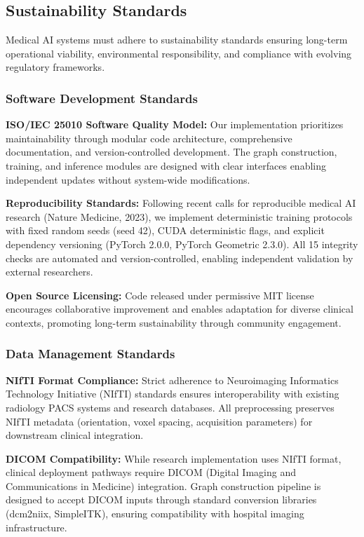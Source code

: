 \subsection{Sustainability Standards}

Medical AI systems must adhere to sustainability standards ensuring long-term operational viability, environmental responsibility, and compliance with evolving regulatory frameworks.

\subsubsection{Software Development Standards}

\textbf{ISO/IEC 25010 Software Quality Model:} Our implementation prioritizes maintainability through modular code architecture, comprehensive documentation, and version-controlled development. The graph construction, training, and inference modules are designed with clear interfaces enabling independent updates without system-wide modifications.

\textbf{Reproducibility Standards:} Following recent calls for reproducible medical AI research (Nature Medicine, 2023), we implement deterministic training protocols with fixed random seeds (seed 42), CUDA deterministic flags, and explicit dependency versioning (PyTorch 2.0.0, PyTorch Geometric 2.3.0). All 15 integrity checks are automated and version-controlled, enabling independent validation by external researchers.

\textbf{Open Source Licensing:} Code released under permissive MIT license encourages collaborative improvement and enables adaptation for diverse clinical contexts, promoting long-term sustainability through community engagement.

\subsubsection{Data Management Standards}

\textbf{NIfTI Format Compliance:} Strict adherence to Neuroimaging Informatics Technology Initiative (NIfTI) standards ensures interoperability with existing radiology PACS systems and research databases. All preprocessing preserves NIfTI metadata (orientation, voxel spacing, acquisition parameters) for downstream clinical integration.

\textbf{DICOM Compatibility:} While research implementation uses NIfTI format, clinical deployment pathways require DICOM (Digital Imaging and Communications in Medicine) integration. Graph construction pipeline is designed to accept DICOM inputs through standard conversion libraries (dcm2niix, SimpleITK), ensuring compatibility with hospital imaging infrastructure.

